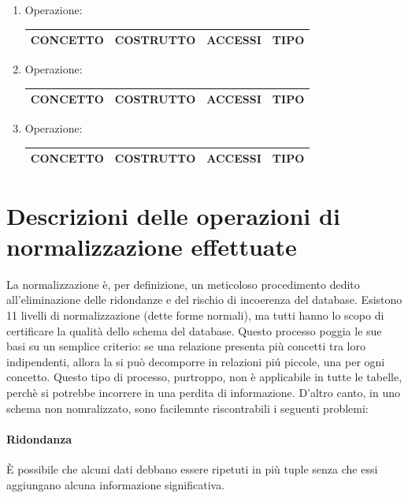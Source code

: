 \documentclass[a4paper, 10pt]{report}
\begin{document}
\begin{enumerate}
\item Operazione: \\
\begin{table}[h!]
\centering
\begin{tabular}{|l|l|l|l|}
\hline
\textbf{CONCETTO}&\textbf{COSTRUTTO}&\textbf{ACCESSI}&\textbf{TIPO}\\
\hline
\end{tabular}
\end{table}

\item Operazione: \\
\begin{table}[h!]
\centering
\begin{tabular}{|l|l|l|l|}
\hline
\textbf{CONCETTO}&\textbf{COSTRUTTO}&\textbf{ACCESSI}&\textbf{TIPO}\\
\hline
\end{tabular}
\end{table}

\item Operazione: \\
\begin{table}[h!]
\centering
\begin{tabular}{|l|l|l|l|}
\hline
\textbf{CONCETTO}&\textbf{COSTRUTTO}&\textbf{ACCESSI}&\textbf{TIPO}\\
\hline
\end{tabular}
\end{table}
\end{enumerate}

\chapter{Descrizioni delle operazioni di normalizzazione effettuate}
La normalizzazione \`e, per definizione, un meticoloso procedimento dedito all'eliminazione delle ridondanze e del rischio di incoerenza del database. Esistono 11 livelli di normalizzazione (dette forme normali), ma tutti hanno lo scopo di certificare la qualit\`a dello schema del database. Questo processo poggia le sue basi su un semplice criterio: se una relazione presenta più concetti tra loro indipendenti, allora la si pu\`o decomporre in relazioni pi\'u piccole, una per ogni concetto. Questo tipo di processo, purtroppo, non \`e applicabile in tutte le tabelle, perch\`e si potrebbe incorrere in una perdita di informazione. D'altro canto, in uno schema non nomralizzato, sono facilemnte riscontrabili i seguenti problemi:
\subsubsection{Ridondanza}
\`E possibile che alcuni dati debbano essere ripetuti in pi\`u tuple senza che essi aggiungano alcuna informazione significativa.
\end{document}
